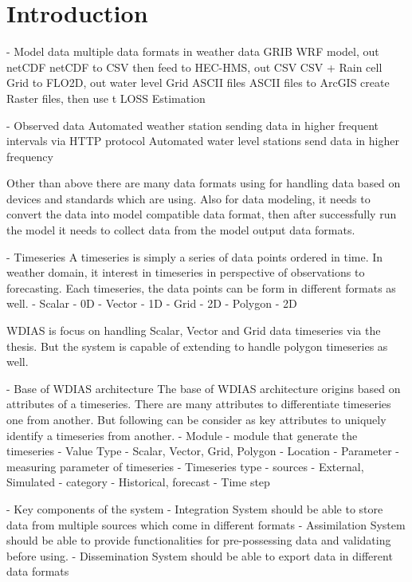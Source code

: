 \section{Introduction}

- Model data
multiple data formats in weather data
GRIB WRF model, out netCDF
netCDF to CSV then feed to HEC-HMS, out CSV
CSV + Rain cell Grid to FLO2D, out water level Grid ASCII files
ASCII files to ArcGIS create Raster files, then use t LOSS Estimation

- Observed data
Automated weather station sending data in higher frequent intervals via HTTP protocol
Automated water level stations send data in higher frequency

Other than above there are many data formats using for handling data based on devices and standards which are using. Also for data modeling, it needs to convert the data into model compatible data format, then after successfully run the model it needs to collect data from the model output data formats.

- Timeseries
A timeseries is simply a series of data points ordered in time. In weather domain, it interest in timeseries in perspective of observations to forecasting.
Each timeseries, the data points can be form in different formats as well.
- Scalar - 0D
- Vector - 1D
- Grid - 2D
- Polygon - 2D

WDIAS is focus on handling Scalar, Vector and Grid data timeseries via the thesis. But the system is capable of extending to handle polygon timeseries as well.

- Base of WDIAS architecture
The base of WDIAS architecture origins based on attributes of a timeseries. There are many attributes to differentiate timeseries one from another. But following can be consider as key attributes to uniquely identify a timeseries from another.
- Module - module that generate the timeseries
- Value Type - Scalar, Vector, Grid, Polygon
- Location 
- Parameter - measuring parameter of timeseries
- Timeseries type
  - sources - External, Simulated
  - category - Historical, forecast
- Time step

- Key components of the system
- Integration
System should be able to store data from multiple sources which come in different formats
- Assimilation
System should be able to provide functionalities for pre-possessing data and validating before using. 
- Dissemination
System should be able to export data in different data formats
